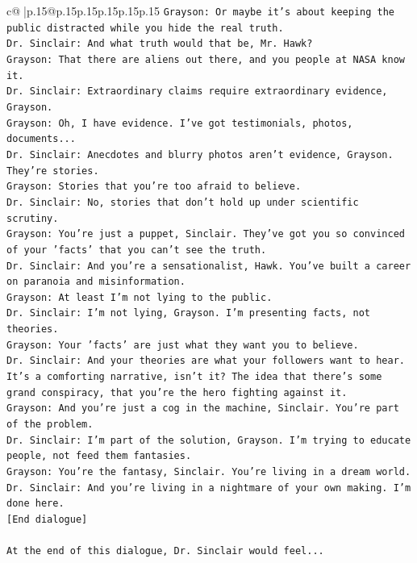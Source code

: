 \documentclass{article}
\begin{document}
{\begin{supertabular}{c@{$\;$}|p{.15\linewidth}@{}p{.15\linewidth}p{.15\linewidth}p{.15\linewidth}p{.15\linewidth}p{.15\linewidth}}
{{{\texttt{Grayson: Or maybe it's about keeping the public distracted while you hide the real truth.} \\
\texttt{Dr. Sinclair: And what truth would that be, Mr. Hawk?} \\
\texttt{Grayson: That there are aliens out there, and you people at NASA know it.} \\
\texttt{Dr. Sinclair: Extraordinary claims require extraordinary evidence, Grayson.} \\
\texttt{Grayson: Oh, I have evidence. I've got testimonials, photos, documents...} \\
\texttt{Dr. Sinclair: Anecdotes and blurry photos aren't evidence, Grayson. They're stories. } \\
\texttt{Grayson: Stories that you're too afraid to believe.} \\
\texttt{Dr. Sinclair: No, stories that don't hold up under scientific scrutiny. } \\
\texttt{Grayson: You're just a puppet, Sinclair. They've got you so convinced of your 'facts' that you can't see the truth.} \\
\texttt{Dr. Sinclair: And you're a sensationalist, Hawk. You've built a career on paranoia and misinformation.} \\
\texttt{Grayson: At least I'm not lying to the public.} \\
\texttt{Dr. Sinclair: I'm not lying, Grayson. I'm presenting facts, not theories.} \\
\texttt{Grayson: Your 'facts' are just what they want you to believe. } \\
\texttt{Dr. Sinclair: And your theories are what your followers want to hear. It's a comforting narrative, isn't it? The idea that there's some grand conspiracy, that you're the hero fighting against it.} \\
\texttt{Grayson: And you're just a cog in the machine, Sinclair. You're part of the problem.} \\
\texttt{Dr. Sinclair: I'm part of the solution, Grayson. I'm trying to educate people, not feed them fantasies.} \\
\texttt{Grayson: You're the fantasy, Sinclair. You're living in a dream world.} \\
\texttt{Dr. Sinclair: And you're living in a nightmare of your own making. I'm done here.} \\
\texttt{{[}End dialogue{]}} \\
\\ 
\texttt{At the end of this dialogue, Dr. Sinclair would feel...} \\
}}}
\end{supertabular}}
\end{document}
